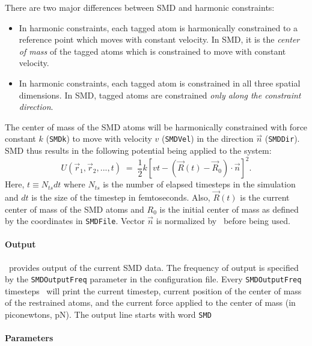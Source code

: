 There are two major differences between SMD and
harmonic constraints:
\begin{itemize}
\item In harmonic constraints, each tagged atom is harmonically constrained
  to a reference point which moves with constant velocity.  In SMD, it is
  the {\em center of mass} of the tagged atoms which is constrained to move
  with constant velocity.

\item In harmonic constraints, each tagged atom is constrained in all three
  spatial dimensions.  In SMD, tagged atoms are constrained {\em only along
  the constraint direction}.
\end{itemize}

The center of mass of the SMD atoms will be harmonically constrained with 
force constant $k$ ({\tt SMDk}) to move with velocity $v$ ({\tt SMDVel}) in 
the direction $\vec n$ ({\tt SMDDir}).  SMD thus results in the following
potential being applied to the system:
\begin{equation}
\label{eq:SMDpotential}
U(\vec r_1, \vec r_2, ..., t) \; = \; \frac{1}{2} 
  k\left[vt - (\vec R(t) - \vec R_0)\cdot \vec n \right]^2.
\end{equation}
Here, $t \equiv N_{ts} dt$ where $N_{ts}$ is the number of elapsed timesteps
in the simulation and $dt$ is the size of the timestep in femtoseconds.
Also, $\vec R(t)$ is the current center of mass of the SMD atoms and $R_0$ is
the initial center of mass as defined by the coordinates in {\tt SMDFile}.
Vector $\vec n$ is normalized by \PDAC\ before being used.  

\paragraph*{Output}

\PDAC\ provides output of the current SMD data. The frequency of
output is specified by the {\tt SMDOutputFreq} parameter in the
configuration file. Every {\tt SMDOutputFreq} timesteps \PDAC\ will
print the current timestep, current position of the center of mass of the
restrained atoms, and
the current force applied to the center of mass (in piconewtons, pN).
The output line starts with word {\tt SMD}

\paragraph*{Parameters}

